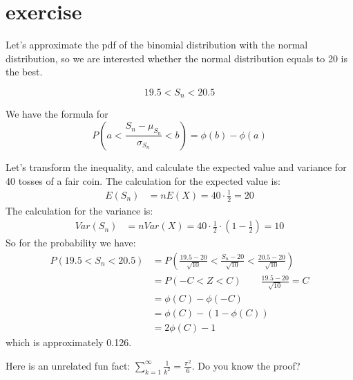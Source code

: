 \documentclass{article}
\begin{document}
\section{exercise}
Let's approximate the pdf of the binomial distribution with the normal distribution,
so we are interested whether the normal distribution equals to 20 is the best.

\[19.5 < {S_n} < 20.5\]

We have the formula for
\[P\left( {a < \frac{{{S_n} - {\mu _{{S_n}}}}}{{{\sigma _{{S_n}}}}} < b} \right) = \phi \left( b \right) - \phi \left( a \right)\]

Let's transform the inequality,
and calculate the expected value and variance for 40 tosses of a fair coin.
The calculation for the expected value is:
\[
    \begin{aligned}
        E\left( {S_n} \right) & = nE\left( X \right) = 40 \cdot \frac{1}{2} = 20
    \end{aligned}
\]
The calculation for the variance is:
\[
    \begin{aligned}
        Var\left( {S_n} \right) & = nVar\left( X \right) = 40 \cdot \frac{1}{2} \cdot \left( 1 - \frac{1}{2} \right) = 10
    \end{aligned}
\]
So for the probability we have:
\[
    \begin{aligned}
        P\left( {19.5 < {S_n} < 20.5} \right) & = P\left( {\frac{{19.5 - 20}}{{\sqrt {10} }} < \frac{{{S_n} - 20}}{{\sqrt {10} }} < \frac{{20.5 - 20}}{{\sqrt {10} }}} \right) \\
                                              & = P\left( { - C < Z< C} \right)  \qquad \frac{{19.5 - 20}}{{\sqrt {10} }} = C                                                  \\
                                              & = \phi (C) - \phi (-C)                                                                                                         \\
                                              & = \phi (C) - (1 - \phi (C))                                                                                                    \\
                                              & = 2\phi (C) - 1
    \end{aligned}
\]
which is approximately 0.126.

Here is an unrelated fun fact: $\sum_{k=1}^\infty \frac{1}{k^2} = \frac{\pi^2}{6}$.
Do you know the proof?
\end{document}
